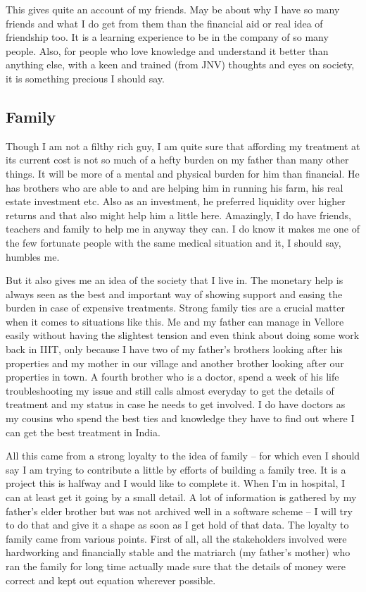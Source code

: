 {This gives quite an account of my friends. May be  about why I have so many friends and what I do get from 
them than the financial aid or real idea of friendship too. It is a learning experience to be in the company 
of so many people. Also, for people who love knowledge and understand it better than anything else, with a keen 
and trained (from JNV) thoughts and eyes on society, it is something precious I should say.   


\subsection*{Family}
   
Though I am not a filthy rich guy, I am quite sure that affording my treatment at its current cost is not so 
much of a hefty burden on my father than many other things. It will be more of a mental and physical 
burden for him than financial. He has brothers who are able to and are helping him in running his farm, 
his real estate investment etc. Also as an investment, he preferred liquidity over higher returns 
and that also might help him a little here. Amazingly, I do have friends, teachers and family to 
help me in anyway they can. I do know it makes me one of the few fortunate people with the same 
medical situation and it, I should say, humbles me. 

But it also gives me an idea of the society that I live in. The monetary help is always seen as the best 
and important way of showing support and easing the burden in case of expensive treatments. 
Strong family ties are a crucial matter when it comes to situations like this. Me and my father can 
manage in Vellore easily without having the slightest tension and even think about doing some work back in IIIT, only 
because I have two of my father's brothers looking after his properties and my mother in our 
village and another brother looking after our properties in town. A fourth brother who is a doctor, 
spend a week of his life troubleshooting my issue and still calls almost everyday to get the 
details of treatment and my status in case he needs to get involved. I do have doctors as my cousins 
who spend the best ties and knowledge they have to find out where I can get the best treatment in India. 

All this came from a strong loyalty to the idea of family -- for which even I should say I am
trying to contribute a little by efforts of building a family tree. It is a project this is halfway and I would 
like to complete it. When I'm in hospital, I can at least get it going by a small detail. A lot of
information is gathered by my father's elder brother but was not archived well in a software scheme 
-- I will try to do that and give it a shape as soon as I get hold of that data. The loyalty to 
family came from various points. First of all, all the stakeholders involved were hardworking and
financially stable and the matriarch (my father's mother) who ran the family for long time actually 
made sure that the details of money were correct and kept out equation wherever possible. 

}
